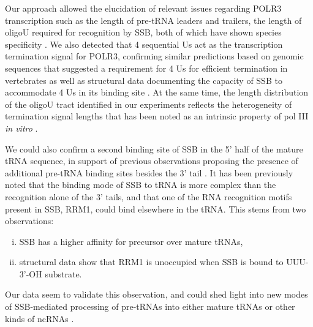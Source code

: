 \documentclass[12pt]{rockefeller}
\begin{document}
Our approach allowed the elucidation of relevant issues regarding POLR3 transcription such as the length of pre-tRNA leaders and trailers, the length of oligoU required for recognition by SSB, both of which have shown species specificity \cite{Arimbasseri:2015jg}. We also detected that 4 sequential Us act as the transcription termination signal for POLR3, confirming similar predictions based on genomic sequences that suggested a requirement for 4 Us for efficient termination in vertebrates \cite{Arimbasseri:2013by,Iben:2012cy} as well as structural data documenting the capacity of SSB to accommodate 4 Us in its binding site \cite{Stefano:1984wp,Teplova:2006dv}. At the same time, the length distribution of the oligoU tract identified in our experiments reflects the heterogeneity of termination signal lengths that has been noted as an intrinsic property of pol III \textit{in vitro} \cite{Arimbasseri:2015jg}.

We could also confirm a second binding site of SSB in the 5’ half of the mature tRNA sequence, in support of previous observations proposing the presence of additional pre-tRNA binding sites besides the 3’ tail \cite{Bayfield:2009cx,Stefano:1984wp}. It has been previously noted that the binding mode of SSB to tRNA is more complex than the recognition alone of the 3’ tails, and that one of the RNA recognition motifs present in SSB, RRM1, could bind elsewhere in the tRNA. This stems from two observations:
\begin{enumerate}[i)]
\item SSB has a higher affinity for precursor over mature tRNAs, 
\item structural data show that RRM1 is unoccupied when SSB is bound to UUU-3’-OH substrate.
\end{enumerate}
Our data seem to validate this observation, and could shed light into new modes of SSB-mediated processing of pre-tRNAs into either mature tRNAs or other kinds of ncRNAs \cite{Hasler:2016ce}. 
\end{document}
